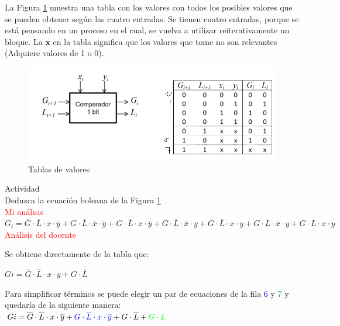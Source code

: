 \documentclass[12pt,letterpaper]{book}
\begin{document}
\begin{multicols}{2}
La Figura \ref{p4}  muestra  una tabla con los valores con todos los posibles valores que se pueden obtener según las cuatro entradas. Se tienen cuatro entradas, porque se está pensando en un proceso en el cual, se vuelva a utilizar reiterativamente un bloque. La \textbf{x} en la tabla significa que los valores que tome no son relevantes (Adquiere valores de 1 o 0).

\begin{figure}[H]
\centering
\includegraphics[width=1\linewidth]{figures/p4.png}
\caption{Tablas de valores}
\label{p4}
\end{figure}
\vspace{0.2cm}
 
Actividad\\
Deduzca la ecuación boleana de la Figura \ref{p4}\\
\textcolor{red}{Mi análisis}\\

$G_i= \overline{G}\cdot \overline{L}\cdot x \cdot \overline{y} + G \cdot \overline{L}\cdot \overline{x}  \cdot \overline{y}+G\cdot \overline{L}\cdot x  \cdot \overline{y}  +G\cdot \overline{L}\cdot \overline{x}  \cdot y + G\cdot \overline{L}\cdot x  \cdot y + G\cdot L\cdot \overline{x}  \cdot y + G \cdot L \cdot x \cdot y$\\


\textcolor{red}{Análisis del docente}

Se obtiene directamente de la tabla que:

$Gi=\overline{G}\cdot \overline{L}\cdot x \cdot \overline{y} + G \cdot \overline{L}$

Para simplificar términos se puede elegir un par de ecuaciones de la fila \textcolor{blue}{6} y \textcolor{green}{7} y quedaría de la siguiente manera:\\
 
$Gi=\overline{G}\cdot \overline{L}\cdot x \cdot \overline{y} + \textcolor{blue}{G\cdot \overline{L}\cdot x \cdot \overline{y}} + G \cdot \overline{L}+\textcolor{green}{G \cdot L}$\\



\end{multicols}
\end{document}
